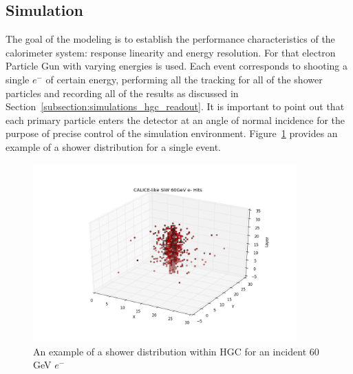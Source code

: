 \subsection{Simulation}
The goal of the modeling is to establish the performance characteristics of the calorimeter system: response linearity and energy resolution. For that electron Particle Gun with varying energies is used. Each event corresponds to shooting a single $e^-$ of certain energy, performing all the tracking for all of the shower particles and recording all of the results as discussed in Section~\ref{subsection:simulations_hgc_readout}. It is important to point out that each primary particle enters the detector at an angle of normal incidence for the purpose of precise control of the simulation environment. Figure~\ref{fig:simulations_hgc_scatter60} provides an example of a shower distribution for a single event.
\begin{figure}[htbp]
    \centering
    \includegraphics[width=0.9\textwidth]{figures/ch_simulations/hgc/scatter_3d/scatter_3D_60GeV.png}
    \caption{An example of a shower distribution within {\sc HGC} for an incident 60 GeV $e^-$}
    \label{fig:simulations_hgc_scatter60}
 \end{figure}

